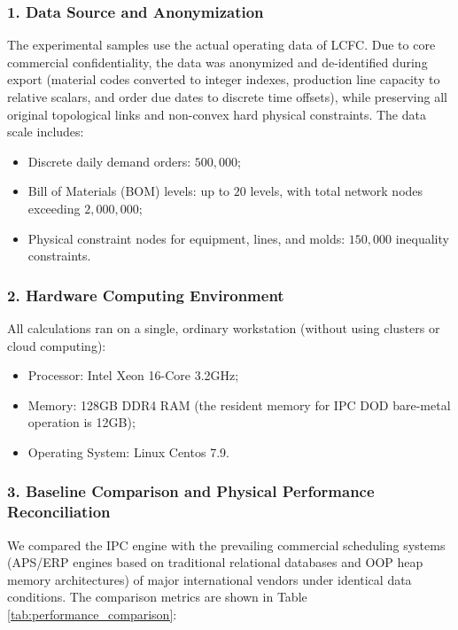 \documentclass{article}
\begin{document}
\subsubsection*{1. Data Source and Anonymization}
The experimental samples use the actual operating data of LCFC. Due to core commercial confidentiality, the data was anonymized and de-identified during export (material codes converted to integer indexes, production line capacity to relative scalars, and order due dates to discrete time offsets), while preserving all original topological links and non-convex hard physical constraints. The data scale includes:
\begin{itemize}
    \item Discrete daily demand orders: $500,000$;
    \item Bill of Materials (BOM) levels: up to $20$ levels, with total network nodes exceeding $2,000,000$;
    \item Physical constraint nodes for equipment, lines, and molds: $150,000$ inequality constraints.
\end{itemize}

\subsubsection*{2. Hardware Computing Environment}
All calculations ran on a single, ordinary workstation (without using clusters or cloud computing):
\begin{itemize}
    \item Processor: Intel Xeon 16-Core 3.2GHz;
    \item Memory: 128GB DDR4 RAM (the resident memory for IPC DOD bare-metal operation is 12GB);
    \item Operating System: Linux Centos 7.9.
\end{itemize}

\subsubsection*{3. Baseline Comparison and Physical Performance Reconciliation}
We compared the IPC engine with the prevailing commercial scheduling systems (APS/ERP engines based on traditional relational databases and OOP heap memory architectures) of major international vendors under identical data conditions. The comparison metrics are shown in Table \ref{tab:performance_comparison}:
\end{document}
